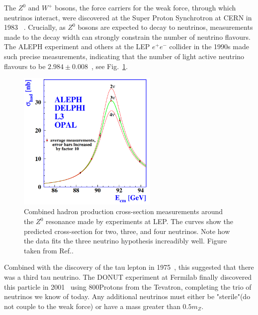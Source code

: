 The $Z^{0}$ and $W^{+}$ bosons, the force carriers for the weak force, through which neutrinos
interact, were discovered at the Super Proton Synchrotron at CERN in 1983
~\cite{arnison1983_z,arnison1983_w}. Crucially, as $Z^{0}$ bosons are expected to decay to
neutrinos, measurements made to the decay width can strongly constrain the number of neutrino
flavours. The ALEPH experiment and others at the LEP $e^{+}e^{-}$ collider in the 1990s made
such precise measurements, indicating that the number of light active neutrino flavours to be
$2.984\pm0.008$~\cite{electroweak2006}, see Fig.~\ref{fig:z_resonance}.

\begin{figure} %
    \includegraphics[origin=c,width=0.6\textwidth]{diagrams/3-theory/z_resonance.png}
    \caption[z resonance short]
    {Combined hadron production cross-section measurements around the $Z^{0}$ resonance made by
        experiments at LEP. The curves show the predicted cross-section for two, three, and four
        neutrinos. Note how the data fits the three neutrino hypothesis increadibly well.
        Figure taken from Ref.\cite{electroweak2006}.}
    \label{fig:z_resonance}
\end{figure} %

Combined with the discovery of the tau lepton in 1975~\cite{perl1975}, this suggested that there
was a third tau neutrino. The DONUT experiment at Fermilab finally discovered this particle in
2001~\cite{Kodama2001} using 800\GeV Protons from the Tevatron, completing the trio of neutrinos
we know of today. Any additional neutrinos must either be "sterile"(do not couple to the weak
force) or have a mass greater than $0.5m_{Z}$.

